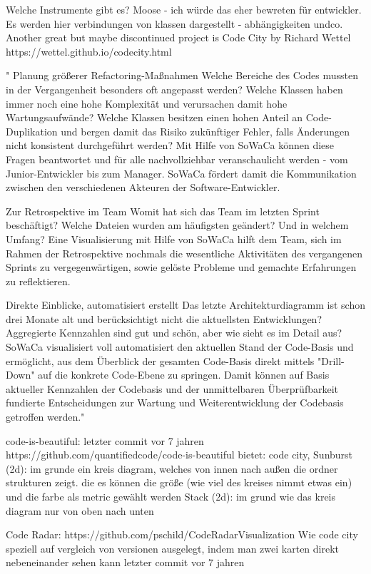 Welche Instrumente gibt es?
Moose - ich würde das eher bewreten für entwickler. Es werden hier verbindungen von klassen dargestellt - abhängigkeiten undco.
Another great but maybe discontinued project is Code City by Richard Wettel
https://wettel.github.io/codecity.html

"
Planung größerer Refactoring-Maßnahmen
Welche Bereiche des Codes mussten in der Vergangenheit besonders oft angepasst werden? Welche Klassen haben immer noch eine hohe Komplexität und verursachen damit hohe Wartungsaufwände? Welche Klassen besitzen einen hohen Anteil an Code-Duplikation und bergen damit das Risiko zukünftiger Fehler, falls Änderungen nicht konsistent durchgeführt werden? Mit Hilfe von SoWaCa können diese Fragen beantwortet und für alle nachvollziehbar veranschaulicht werden - vom Junior-Entwickler bis zum Manager. SoWaCa fördert damit die Kommunikation zwischen den verschiedenen Akteuren der Software-Entwickler.

Zur Retrospektive im Team
Womit hat sich das Team im letzten Sprint beschäftigt? Welche Dateien wurden am häufigsten geändert? Und in welchem Umfang? Eine Visualisierung mit Hilfe von SoWaCa hilft dem Team, sich im Rahmen der Retrospektive nochmals die wesentliche Aktivitäten des vergangenen Sprints zu vergegenwärtigen, sowie gelöste Probleme und gemachte Erfahrungen zu reflektieren.

Direkte Einblicke, automatisiert erstellt
Das letzte Architekturdiagramm ist schon drei Monate alt und berücksichtigt nicht die aktuellsten Entwicklungen? Aggregierte Kennzahlen sind gut und schön, aber wie sieht es im Detail aus? SoWaCa visualisiert voll automatisiert den aktuellen Stand der Code-Basis und ermöglicht, aus dem Überblick der gesamten Code-Basis direkt mittels "Drill-Down" auf die konkrete Code-Ebene zu springen. Damit können auf Basis aktueller Kennzahlen der Codebasis und der unmittelbaren Überprüfbarkeit fundierte Entscheidungen zur Wartung und Weiterentwicklung der Codebasis getroffen werden."
\cite{systect_2015}


code-is-beautiful: letzter commit vor 7 jahren
https://github.com/quantifiedcode/code-is-beautiful
bietet: code city, 
Sunburst (2d): im grunde ein kreis diagram, welches von  innen nach außen die ordner strukturen zeigt. die es können die größe (wie viel des kreises nimmt etwas ein) und die farbe als metric gewählt werden
Stack (2d): im grund wie das kreis diagram nur von oben nach unten


Code Radar:
https://github.com/pschild/CodeRadarVisualization
Wie code city speziell auf vergleich von versionen ausgelegt, indem man zwei karten direkt nebeneinander sehen kann
letzter commit vor 7 jahren


